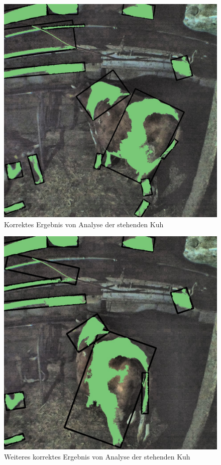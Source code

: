 \begin{figure}[H]
	\center
	\includegraphics[scale=0.3]{Grafiken/resultate/resultatStanding2.jpg}
	\caption{Korrektes Ergebnis von Analyse der stehenden Kuh} 
	\label{fig: Korrektes Ergebnis von Analyse der stehenden Kuh} 
\end{figure}



\begin{figure}[H]
	\center
	\includegraphics[scale=0.3]{Grafiken/resultate/resultatStanding1.jpg}
	\caption{Weiteres korrektes Ergebnis von Analyse der stehenden Kuh} 
	\label{fig: Weiteres korrektes Ergebnis von Analyse der stehenden Kuh} 
\end{figure}

